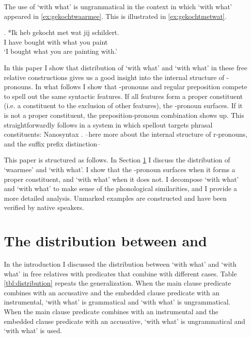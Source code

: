 \documentclass[12pt]{article}
\begin{document}
The use of  `with what' is ungrammatical in the context in which  `with what' appeared in \ref{ex:gekochtwaarmee}. This is illustrated in \ref{ex:gekochtmetwat}.

\exg. *Ik heb gekocht met wat jij schildert.\\
 I have bought with what you paint\\
 `I bought what you are painting with.'\label{ex:gekochtmetwat}

In this paper I show that distribution of  `with what' and  `with what' in these free relative constructions gives us a good insight into the internal structure of -pronouns. In what follows I show that -pronouns and regular preposition compete to spell out the same syntactic features. If all features form a proper constituent (i.e. a constituent to the exclusion of other features), the -pronoun surfaces. If it is not a proper constituent, the preposition-pronoun combination shows up. This straightforwardly follows in a system in which spellout targets phrasal constituents: Nanosyntax \citep{starke2009}. --here more about the internal structure of r-pronouns, and the suffix prefix distinction--

This paper is structured as follows. In Section \ref{sec:distribution} I discuss the distribution of  `waarmee' and  `with what'. I show that the -pronoun surfaces when it forms a proper constituent, and  `with what' when it does not. I decompose  `with what' and  `with what' to make sense of the phonological similarities, and I provide a more detailed analysis. Unmarked examples are constructed and have been verified by native speakers.


\section{The distribution between  and }\label{sec:distribution}

In the introduction I discussed the distribution between  `with what' and  `with what' in free relatives with predicates that combine with different cases. Table \ref{tbl:distribution} repeats the generalization. When the main clause predicate combines with an accusative and the embedded clause predicate with an instrumental,  `with what' is grammatical and  `with what' is ungrammatical. When the main clause predicate combines with an instrumental and the embedded clause predicate with an accusative,  `with what' is ungrammatical and  `with what' is used.
\end{document}
